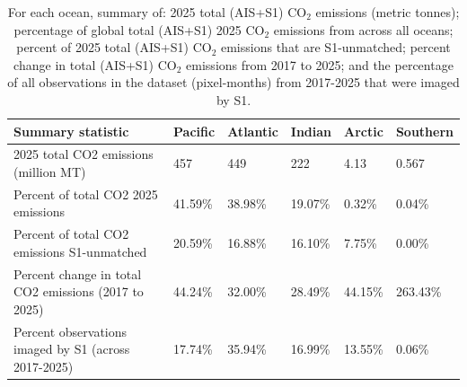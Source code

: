 \begin{table}[!h]
\centering
\caption{\label{tab:emissions_by_ocean_summary_tbl}For each ocean, summary of: 2025 total (AIS+S1) CO$_2$ emissions (metric tonnes); percentage of global total (AIS+S1) 2025 CO$_2$ emissions from across all oceans; percent of 2025 total (AIS+S1) CO$_2$ emissions that are S1-unmatched; percent change in total (AIS+S1) CO$_2$ emissions from 2017 to 2025; and the percentage of all observations in the dataset (pixel-months) from 2017-2025 that were imaged by S1.}
\centering
\fontsize{7}{9}\selectfont
\setlength{\tabcolsep}{3pt}
\begin{tabular}[t]{l|l|l|l|l|l}
\hline
Summary statistic & Pacific & Atlantic & Indian & Arctic & Southern\\
\hline
2025 total CO2 emissions (million MT) & 457 & 449 & 222 & 4.13 & 0.567\\
\hline
Percent of total CO2 2025 emissions & 41.59\% & 38.98\% & 19.07\% & 0.32\% & 0.04\%\\
\hline
Percent of total CO2 emissions S1-unmatched & 20.59\% & 16.88\% & 16.10\% & 7.75\% & 0.00\%\\
\hline
Percent change in total CO2 emissions (2017 to 2025) & 44.24\% & 32.00\% & 28.49\% & 44.15\% & 263.43\%\\
\hline
Percent observations imaged by S1 (across 2017-2025) & 17.74\% & 35.94\% & 16.99\% & 13.55\% & 0.06\%\\
\hline
\end{tabular}
\end{table}
